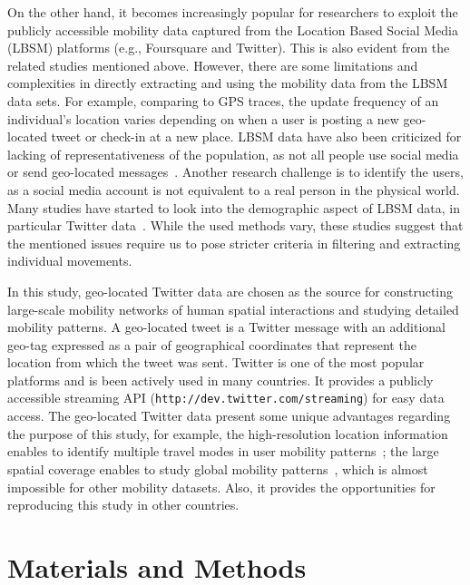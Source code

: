 \documentclass[]{tGIS2e}
\begin{document}
On the other hand, it becomes increasingly popular for researchers to exploit the publicly accessible mobility data captured from the Location Based Social Media (LBSM) platforms (e.g., Foursquare and Twitter).
This is also evident from the related studies mentioned above.
However, there are some limitations and complexities in directly extracting and using the mobility data from the LBSM data sets. 
For example, comparing to GPS traces, the update frequency of an individual's location varies depending on when a user is posting a new geo-located tweet or check-in at a new place.
LBSM data have also been criticized for lacking of representativeness of the population, as not all people use social media or send geo-located messages~\citep{kung2014}. 
Another research challenge is to identify the users, as a social media account is not equivalent to a real person in the physical world.
Many studies have started to look into the demographic aspect of LBSM data, in particular Twitter data~\citep{steiger2015,luo2016}. 
While the used methods vary, these studies suggest that the mentioned issues require us to pose stricter criteria in filtering and extracting individual movements.

In this study, geo-located Twitter data are chosen as the source for constructing large-scale mobility networks of human spatial interactions and studying detailed mobility patterns.
A geo-located tweet is a Twitter message with an additional geo-tag expressed as a pair of geographical coordinates that represent the location from which the tweet was sent.
Twitter is one of the most popular platforms and is been actively used in many countries. 
It provides a publicly accessible streaming API ({\tt{http://dev.twitter.com/streaming}}) for easy data access.
The geo-located Twitter data present some unique advantages regarding the purpose of this study, for example, the high-resolution location information enables to identify multiple travel modes in user mobility patterns~\citep{jurdak2015}; the large spatial coverage enables to study global mobility patterns~\citep{hawelka}, which is almost impossible for other mobility datasets. Also, it provides the opportunities for reproducing this study in other countries.

\section{Materials and Methods}
\end{document}
